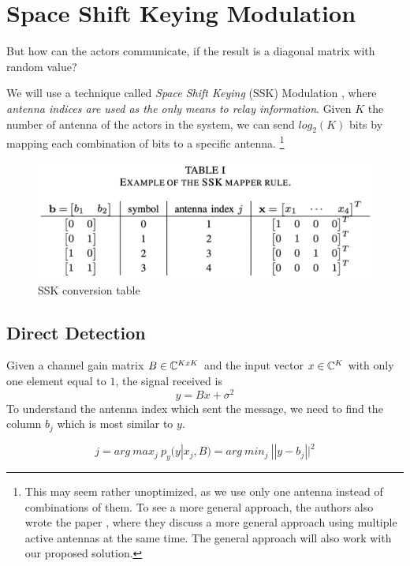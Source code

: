 \section{Space Shift Keying Modulation}
But how can the actors communicate, if the result is a diagonal matrix with random value?

We will use a technique called \textit{Space Shift Keying} (SSK) Modulation \cite{5165332}, where \textit{antenna indices are used as the only means to relay information}. Given $K$ the number of antenna of the actors in the system, we can send $log_2(K)$ bits by mapping each combination of bits to a specific antenna.
\footnote{This may seem rather unoptimized, as we use only one antenna instead of combinations of them. To see a more general approach, the authors also wrote the paper \cite{4699782}, where they discuss a more general approach using multiple active antennas at the same time. The general approach will also work with our proposed solution.}

\begin{figure}[H]
  \centering
  \includegraphics[width=\linewidth]{imgs/ssk_conversion_table.png}
  \caption{SSK conversion table}
  \label{fig:ssk_conversion_table}
\end{figure}

\subsection{Direct Detection}
Given a channel gain matrix $B \in \mathbb{C}^{KxK}$ and the input vector $x \in \mathbb{C}^K$ with only one element equal to $1$, the signal received is
\begin{equation}
  y = Bx + \sigma^2
\end{equation}
To understand the antenna index which sent the message, we need to find the column $b_j$ which is most similar to $y$.

\begin{equation}
  j = arg\ max_j\ p_y (y | x_j, B) = arg\ min_j\ || y - b_j ||^2
  \label{eq:direct_detection}
\end{equation}

